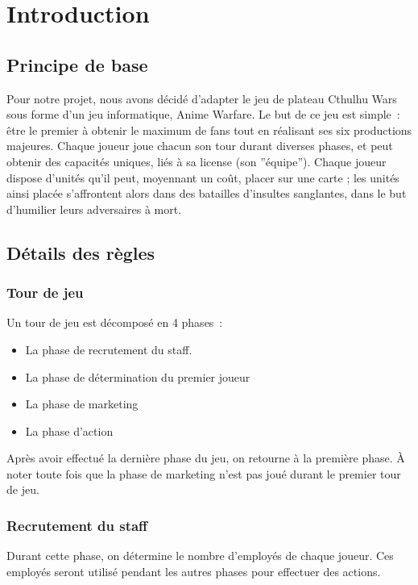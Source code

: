 \chapter{Introduction}

    \section{Principe de base}

        Pour notre projet, nous avons décidé d'adapter le jeu de plateau Cthulhu Wars
        sous forme d'un jeu informatique, Anime Warfare. Le but de ce jeu est simple :
        être le premier à obtenir le maximum de fans tout en réalisant ses six productions
        majeures. Chaque joueur joue chacun son tour durant diverses phases, et peut obtenir
        des capacités uniques, liés à sa license (son ''équipe'').
        \newline
        Chaque joueur dispose d'unités qu'il peut, moyennant un coût, placer sur une
        carte ; les unités ainsi placée s'affrontent alors dans des batailles d'insultes
        sanglantes, dans le but d'humilier leurs adversaires à mort.


    \section{Détails des règles}

        \subsection{Tour de jeu}

            Un tour de jeu est décomposé en 4 phases :

            \begin{itemize}
                \item La phase de recrutement du staff.
                \item La phase de détermination du premier joueur
                \item La phase de marketing
                \item La phase d'action
            \end{itemize}

            Après avoir effectué la dernière phase du jeu, on retourne à la première phase.
            À noter toute fois que la phase de marketing n'est pas joué durant le premier tour de jeu.

        \subsection{Recrutement du staff}
            Durant cette phase, on détermine le nombre d'employés de chaque joueur. Ces employés seront utilisé
            pendant les autres phases pour effectuer des actions.

